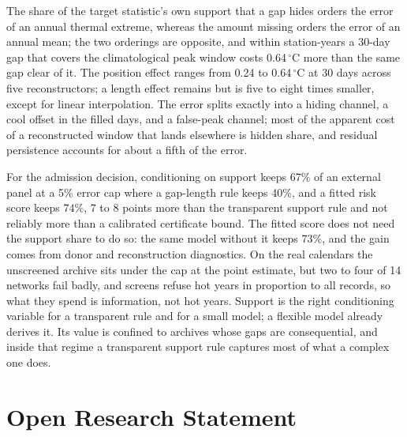 \documentclass[draft]{agujournal2025}
\begin{document}
The share of the target statistic's own support that a gap hides orders the error
of an annual thermal extreme, whereas the amount missing orders the error of an
annual mean; the two orderings are opposite, and within station-years a 30-day
gap that covers the climatological peak window costs 0.64\,$^{\circ}$C more than
the same gap clear of it. The position effect ranges from 0.24 to 0.64\,$^{\circ}$C at 30 days
across five reconstructors; a length effect remains but is five to eight times
smaller, except for linear interpolation. The error splits exactly into a hiding channel,
a cool offset in the filled days, and a false-peak channel; most of the apparent
cost of a reconstructed window that lands elsewhere is hidden share, and residual
persistence accounts for about a fifth of the error.

For the admission decision, conditioning on support keeps 67\% of an external
panel at a 5\% error cap where a gap-length rule keeps 40\%, and a fitted risk
score keeps 74\%, 7 to 8 points more than the transparent support rule and not
reliably more than a calibrated certificate bound. The fitted score does not need
the support share to do so: the same model without it keeps 73\%, and the gain comes
from donor and reconstruction diagnostics. On the real calendars the unscreened
archive sits under the cap at the point estimate, but two to four of 14 networks
fail badly, and screens refuse hot years in proportion to all records, so what
they spend is information, not hot years. Support is the right conditioning
variable for a transparent rule and for a small model; a flexible model already
derives it. Its value is confined to archives whose gaps are consequential, and
inside that regime a transparent support rule captures most of what a complex one
does.

\section*{Open Research Statement}
\end{document}
